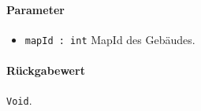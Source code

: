 \paragraph*{Parameter}
\begin{itemize}
    \item \texttt{mapId : int} MapId des Gebäudes.
\end{itemize}
\paragraph*{Rückgabewert}
\texttt{Void}.
